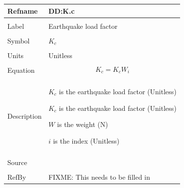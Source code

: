 \documentclass[12pt]{article}
\begin{document}
\noindent \begin{minipage}{\textwidth}
\begin{tabular}{p{} p{}}
\toprule \textbf{Refname} & \textbf{DD:K.c}
\label{DD:K.c}
\\ \midrule \\
Label & Earthquake load factor
\\ \midrule \\
Symbol & ${K_{c}}$
\\ \midrule \\
Units & Unitless
\\ \midrule \\
Equation & \begin{dmath}
           {K_{c}}={K_{c}} W_{i}
           \end{dmath}
\\ \midrule \\
Description & \begin{symbDescription}
              \item{${K_{c}}$ is the earthquake load factor (Unitless)}
              \item{${K_{c}}$ is the earthquake load factor (Unitless)}
              \item{$W$ is the weight (N)}
              \item{$i$ is the index (Unitless)}
              \end{symbDescription}
\\ \midrule \\
Source & 
\\ \midrule \\
RefBy & FIXME: This needs to be filled in
\\ \bottomrule \end{tabular}
\end{minipage}\\
~\newline
\end{document}
